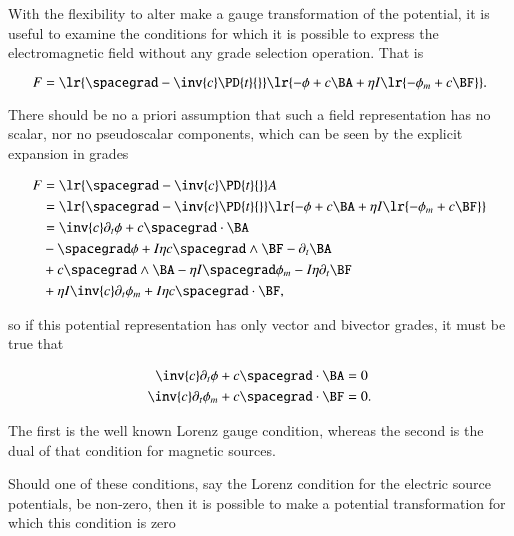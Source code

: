
With the flexibility to alter make a gauge transformation of the potential, it is useful to examine the conditions for which it is possible to express the electromagnetic field without any grade selection operation.
That is

\begin{dmath}\label{eqn:potentialSection:1720}
F
=
\lr{ \spacegrad - \inv{c} \PD{t}{} }
\lr{
      - \phi
      + c \BA
      + \eta I \lr{ -\phi_m + c \BF }
}.
\end{dmath}

There should be no a priori assumption that such a field representation has no scalar, nor no pseudoscalar components, which can be seen by the explicit expansion in grades

\begin{dmath}\label{eqn:potentialSection:1640}
\begin{aligned}
F
&=
\lr{ \spacegrad - \inv{c} \PD{t}{} } A \\
&=
\lr{ \spacegrad - \inv{c} \PD{t}{} } \lr{ -\phi + c \BA + \eta I \lr{ -\phi_m + c \BF } } \\
&=
\inv{c} \partial_t \phi
+ c \spacegrad \cdot \BA  \\
&-\spacegrad \phi
+ I \eta c \spacegrad \wedge \BF
- \partial_t \BA  \\
&+ c \spacegrad \wedge \BA
- \eta I \spacegrad \phi_m
- I \eta \partial_t \BF \\
&+ \eta I \inv{c} \partial_t \phi_m
+ I \eta c \spacegrad \cdot \BF,
\end{aligned}
\end{dmath}

so if this potential representation has only vector and bivector grades, it must be true that

\begin{dmath}\label{eqn:potentialSection:1660}
\begin{aligned}
\inv{c} \partial_t \phi + c \spacegrad \cdot \BA &= 0 \\
\inv{c} \partial_t \phi_m + c \spacegrad \cdot \BF &= 0.
\end{aligned}
\end{dmath}

The first is the well known Lorenz gauge condition, whereas the second is the dual of that condition for magnetic sources.

Should one of these conditions, say the Lorenz condition for the electric source potentials, be non-zero, then it is possible to make a potential transformation for which this condition is zero

